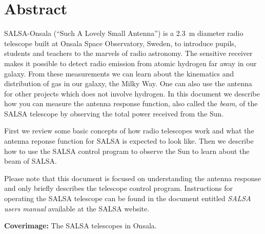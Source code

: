 \chapter*{Abstract}
SALSA-Onsala (``Such A Lovely Small Antenna'') is a 2.3~m diameter radio
telescope built at Onsala Space Observatory, Sweden, to introduce pupils,
students and teachers to the marvels of radio astronomy.  The sensitive
receiver makes it possible to detect radio emission from atomic hydrogen far
away in our galaxy. From these measurements we can learn about the kinematics
and distribution of gas in our galaxy, the Milky Way. One can also use
the antenna for other projects which does not involve hydrogen. In this
document we describe how you can measure the antenna response function,
also called the \emph{beam}, of the SALSA telescope by observing the 
total power received from the Sun.

First we review some basic concepts of how radio telescopes work and
what the antenna reponse function for SALSA is expected to look like. 
Then we describe how to use the SALSA control program to observe the
Sun to learn about the beam of SALSA. 

Please note that this document is focused on understanding the antenna
response and only briefly describes the telescope control program. 
Instructions for operating the SALSA telescope can be found in the document
entitled \emph{SALSA users manual} available at the SALSA website.


\vspace{9cm}




{\bf Coverimage:} The SALSA telescopes in Onsala.
